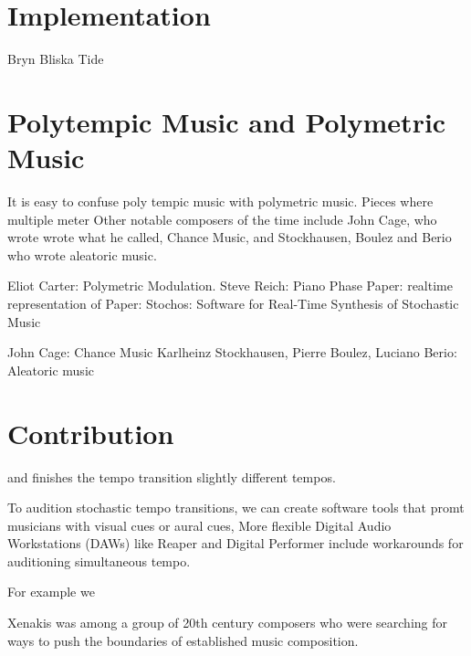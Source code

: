 \section{Implementation}
\label{sec:polytempic-implementation}

Bryn Bliska Tide



\section{Polytempic Music and Polymetric Music}
\label{sec:polytempic-vs-polymetric}
It is easy to confuse poly tempic music with polymetric music.  Pieces
where multiple meter
Other notable composers
of the time include John Cage, who wrote wrote what he called, Chance
Music, and Stockhausen, Boulez and Berio who wrote aleatoric music.



Eliot Carter: Polymetric Modulation. 
Steve Reich: Piano Phase
Paper: realtime representation of 
Paper: Stochos: Software for Real-Time Synthesis of Stochastic Music

John Cage: Chance Music
Karlheinz Stockhausen, Pierre Boulez, Luciano Berio: Aleatoric music

\section{Contribution}
\label{sec:polytempic-contribution}

and finishes the tempo transition slightly different tempos.

To audition stochastic tempo transitions, we can create software tools
that promt musicians with visual cues or aural cues, 
More flexible Digital Audio Workstations (DAWs) like Reaper and
Digital Performer include workarounds for auditioning simultaneous
tempo. 

For example we 

Xenakis was among a group of
20th century composers who were searching for ways to push the
boundaries of established music composition.


